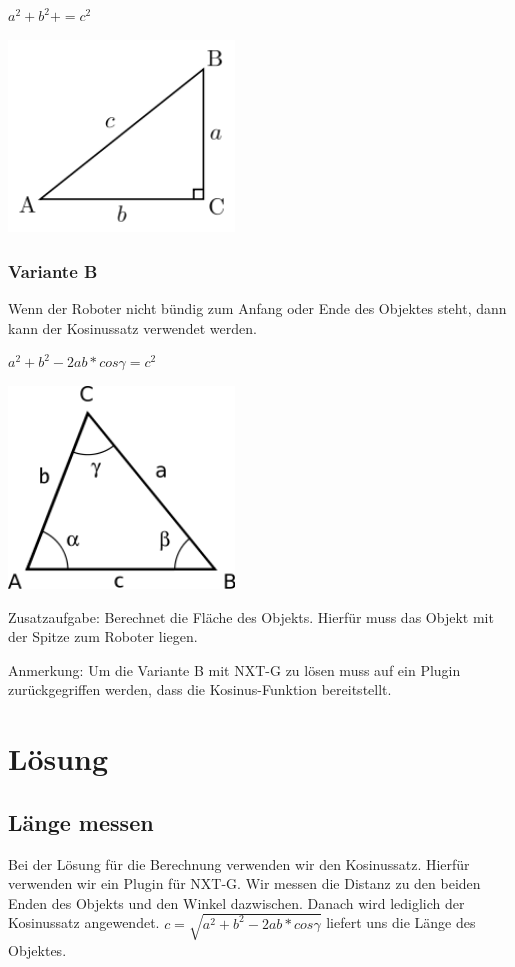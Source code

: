 $a^2 + b^2 + = c^2$

\begin{capfigure}[Pythagoras]
	\includegraphics[width=6cm]{images/pythagoras.png}
\end{capfigure}

\clearpage
\subsubsection{Variante B}
Wenn der Roboter nicht bündig zum Anfang oder Ende des Objektes steht, dann kann der Kosinussatz verwendet werden.

$a^2 + b^2 - 2ab*cos\gamma = c^2$

\begin{capfigure}[Kosinussatz]
	\includegraphics[width=6cm]{images/kosinus.png}
\end{capfigure}

Zusatzaufgabe: Berechnet die Fläche des Objekts. Hierfür muss das Objekt mit der Spitze zum Roboter liegen. 

Anmerkung: Um die Variante B mit NXT-G zu lösen muss auf ein Plugin zurückgegriffen werden, dass die Kosinus-Funktion bereitstellt. 

\section{Lösung}
\subsection{Länge messen}
Bei der Lösung für die Berechnung verwenden wir den Kosinussatz. Hierfür verwenden wir ein Plugin für NXT-G. Wir messen die Distanz zu den beiden Enden des Objekts und den Winkel dazwischen. Danach wird lediglich der Kosinussatz angewendet. $c = \sqrt{a^2 + b^2 - 2ab*cos\gamma}$ liefert uns die Länge des Objektes.

